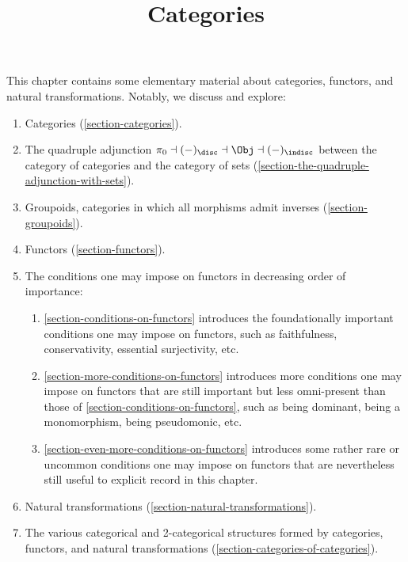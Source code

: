 

%



\title{Categories}

\maketitle

\label{section-phantom}

This chapter contains some elementary material about categories, functors, and natural transformations. Notably, we discuss and explore:
\begin{enumerate}
    \item Categories (\cref{section-categories}).
    \item The quadruple adjunction $\pi_{0}\dashv{(-)_{\disc}}\dashv\Obj\dashv{(-)_{\indisc}}$ between the category of categories and the category of sets (\cref{section-the-quadruple-adjunction-with-sets}).
    \item Groupoids, categories in which all morphisms admit inverses (\cref{section-groupoids}).
    \item Functors (\cref{section-functors}).
    \item The conditions one may impose on functors in decreasing order of importance:
        \begin{enumerate}
            \item \cref{section-conditions-on-functors} introduces the foundationally important conditions one may impose on functors, such as faithfulness, conservativity, essential surjectivity, etc.
            \item \cref{section-more-conditions-on-functors} introduces more conditions one may impose on functors that are still important but less omni-present than those of \cref{section-conditions-on-functors}, such as being dominant, being a monomorphism, being pseudomonic, etc.
            \item \cref{section-even-more-conditions-on-functors} introduces some rather rare or uncommon conditions one may impose on functors that are nevertheless still useful to explicit record in this chapter.
        \end{enumerate}
    \item Natural transformations (\cref{section-natural-transformations}).
    \item The various categorical and 2-categorical structures formed by categories, functors, and natural transformations (\cref{section-categories-of-categories}).
\end{enumerate}

